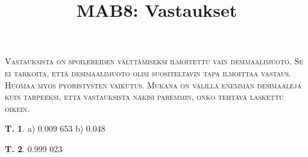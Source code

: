 \documentclass[12pt,leqno,a4paper,oneside]{amsart}
\theoremstyle{definition}
\newtheorem{exercise}{T.}
\theoremstyle{remark}
\numberwithin{equation}{section}
\begin{document}
\title{MAB8: Vastaukset}
\maketitle

\textsc{Vastauksista on spoilereiden välttämiseksi ilmoitettu vain desimaalimuoto. Se ei tarkoita, että desimaalimuoto olisi suositeltavin tapa
ilmoittaa vastaus. Huomaa myös pyöristysten vaikutus. Mukana on välillä enemmän desimaaleja kuin tarpeeksi, että vastauksista näkisi
paremmin, onko tehtävä laskettu oikein.}

\label{1-1}


\label{1-2}


\label{1-3}

\label{1-4}

\label{1-5}










\label{lottolkm}












\begin{exercise}a) 0.009 653
b) 0.048
\end{exercise}

\begin{exercise}
0.999 023
\end{exercise}
\end{document}
